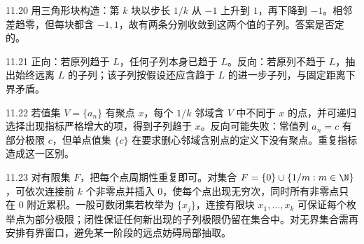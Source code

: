\begin{solution}{11.20}
用三角形块构造：第 \(k\) 块以步长 \(1/k\) 从 \(-1\) 上升到 \(1\)，再下降到 \(-1\)。相邻差趋零，但每块都含 \(-1,1\)，故有两条分别收敛到这两个值的子列。答案是否定的。
\end{solution}

\begin{solution}{11.21}
正向：若原列趋于 \(L\)，任何子列本身已趋于 \(L\)。反向：若原列不趋于 \(L\)，抽出始终远离 \(L\) 的子列；该子列按假设还应含趋于 \(L\) 的进一步子列，与固定距离下界矛盾。
\end{solution}

\begin{solution}{11.22}
若值集 \(V=\{a_n\}\) 有聚点 \(x\)，每个 \(1/k\) 邻域含 \(V\) 中不同于 \(x\) 的点，并可递归选择出现指标严格增大的项，得到子列趋于 \(x\)。反向可能失败：常值列 \(a_n=c\) 有部分极限 \(c\)，但单点值集 \(\{c\}\) 在要求删心邻域含别点的定义下没有聚点。重复指标造成这一区别。
\end{solution}

\begin{solution}{11.23}
对有限集 \(F\)，把每个点周期性重复即可。对集合
\(F=\{0\}\cup\{1/m:m\in\N\}\)，可依次连接前 \(k\) 个非零点并插入 \(0\)，使每个点出现无穷次，同时所有非零点只在 \(0\) 附近累积。一般可数闭集若枚举为 \(\{x_j\}\)，连接有限块
\(x_1,\ldots,x_k\) 可保证每个枚举点为部分极限；闭性保证任何新出现的子列极限仍留在集合中。对无界集合需再安排有界窗口，避免某一阶段的远点妨碍局部抽取。
\end{solution}
